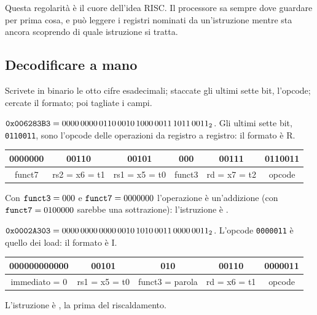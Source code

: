 Questa regolarità è il cuore dell'idea RISC. Il processore sa sempre dove
guardare per prima cosa, e può leggere i registri nominati da un'istruzione
mentre sta ancora scoprendo di quale istruzione si tratta.

\subsection{Decodificare a mano}

\begin{prgconcept}[Il metodo]
Scrivete in binario le otto cifre esadecimali; staccate gli ultimi sette bit,
l'opcode; cercate il formato; poi tagliate i campi.
\end{prgconcept}

\begin{example}{}
$\texttt{0x006283B3}=0000\,0000\,0110\,0010\,1000\,0011\,1011\,0011_2$. Gli ultimi
sette bit, \texttt{0110011}, sono l'opcode delle operazioni da registro a
registro: il formato è R.
\begin{center}\small\ttfamily
\begin{tabular}{|c|c|c|c|c|c|}\hline
0000000&00110&00101&000&00111&0110011\\\hline
\multicolumn{1}{c}{\textrm{\scriptsize funct7}}&\multicolumn{1}{c}{\textrm{\scriptsize rs2 = x6 = t1}}&\multicolumn{1}{c}{\textrm{\scriptsize rs1 = x5 = t0}}&\multicolumn{1}{c}{\textrm{\scriptsize funct3}}&\multicolumn{1}{c}{\textrm{\scriptsize rd = x7 = t2}}&\multicolumn{1}{c}{\textrm{\scriptsize opcode}}
\end{tabular}
\end{center}
Con $\texttt{funct3}=000$ e $\texttt{funct7}=0000000$ l'operazione è un'addizione
(con $\texttt{funct7}=0100000$ sarebbe una sottrazione): l'istruzione è
.
\end{example}

\begin{example}{}
$\texttt{0x0002A303}=0000\,0000\,0000\,0010\,1010\,0011\,0000\,0011_2$. L'opcode
\texttt{0000011} è quello dei load: il formato è I.
\begin{center}\small\ttfamily
\begin{tabular}{|c|c|c|c|c|}\hline
000000000000&00101&010&00110&0000011\\\hline
\multicolumn{1}{c}{\textrm{\scriptsize immediato = 0}}&\multicolumn{1}{c}{\textrm{\scriptsize rs1 = x5 = t0}}&\multicolumn{1}{c}{\textrm{\scriptsize funct3 = parola}}&\multicolumn{1}{c}{\textrm{\scriptsize rd = x6 = t1}}&\multicolumn{1}{c}{\textrm{\scriptsize opcode}}
\end{tabular}
\end{center}
L'istruzione è , la prima del riscaldamento.
\end{example}

